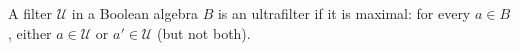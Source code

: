 A filter $\mathcal{U}$ in a Boolean algebra $B$ is an ultrafilter if it is maximal: for every $a \in B$, either $a \in \mathcal{U}$ or $a' \in \mathcal{U}$ (but not both).
